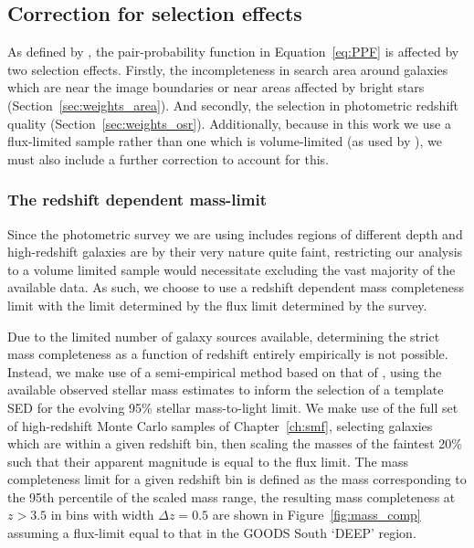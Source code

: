 \subsection{Correction for selection effects}
As defined by , the pair-probability function in Equation~\ref{eq:PPF} is affected by two selection effects. Firstly, the incompleteness in search area around galaxies which are near the image boundaries or near areas affected by bright stars (Section~\ref{sec:weights_area}). And secondly, the selection in photometric redshift quality (Section~\ref{sec:weights_osr}). Additionally, because in this work we use a flux-limited sample rather than one which is volume-limited (as used by ), we must also include a further correction to account for this.

\subsubsection{The redshift dependent mass-limit}\label{sec:weights_flux}
Since the photometric survey we are using includes regions of different depth and high-redshift galaxies are by their very nature quite faint, restricting our analysis to a volume limited sample would necessitate excluding the vast majority of the available data. As such, we choose to use a redshift dependent mass completeness limit with the limit determined by the flux limit determined by the survey. 

Due to the limited number of galaxy sources available, determining the strict mass completeness as a function of redshift entirely empirically \citep{Pozzetti:2010gw} is not possible. Instead, we make use of a semi-empirical method based on that of \citet{Pozzetti:2010gw}, using the available observed stellar mass estimates to inform the selection of a template SED for the evolving 95\% stellar mass-to-light limit. We make use of the full set of high-redshift Monte Carlo samples of Chapter~\ref{ch:smf}, selecting galaxies which are within a given redshift bin, then scaling the masses of the faintest 20\% such that their apparent magnitude is equal to the flux limit. The mass completeness limit for a given redshift bin is defined as the mass corresponding to the 95th percentile of the scaled mass range, the resulting mass completeness at $z > 3.5$ in bins with width $\Delta z = 0.5$ are shown in Figure~\ref{fig:mass_comp} assuming a flux-limit equal to that in the GOODS South `DEEP' region.

